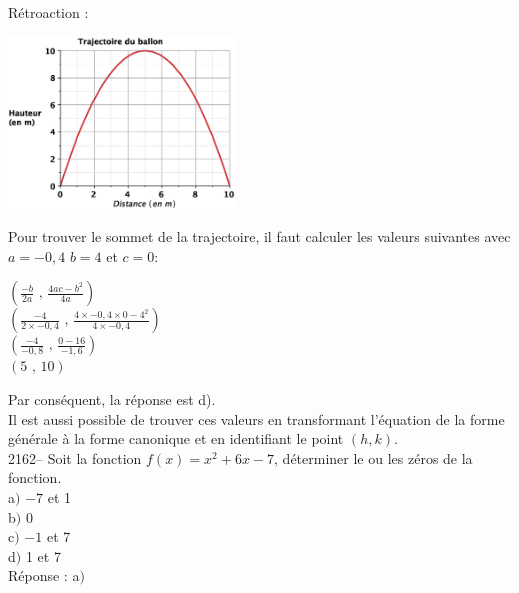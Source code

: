\documentclass[letterpaper, 12pt]{article}
\begin{document}
R\'etroaction :\\
\begin{center}
 \includegraphics[width=6cm,bb=20 186 575 605]{Q2144.eps}
\end{center}
Pour trouver le sommet de la trajectoire, il faut calculer les valeurs suivantes avec $a=-0,4$ $b=4$ et $c=0$:
\begin{center}
 $\left( \frac{-b}{2a} \textrm{ , } \frac{4ac - b^{2}}{4a} \right)$\\[2mm]
 $\left( \frac{-4}{2\times-0,4} \textrm{ , } \frac{4\times -0,4\times 0 - 4^{2}}{4\times -0,4} \right)$\\[2mm]
 $\left( \frac{-4}{-0,8} \textrm{ , } \frac{0 - 16}{-1,6} \right)$\\[2mm]
 $\left( 5 \textrm{ , } 10 \right)$\\
\end{center}
Par cons\'equent, la r\'eponse est d).\\
Il est aussi possible de trouver ces valeurs en transformant l'\'equation de la forme g\'en\'erale \`a la forme canonique et en identifiant le point $(h, k)$.\\

2162-- Soit la fonction $f(x)=x^{2}+6x-7$, d\'eterminer le ou les z\'eros de la fonction.\\

a$)$ $-7$ et 1\\
b$)$ 0\\
c$)$ $-1$ et 7\\
d$)$ 1 et 7\\

R\'eponse : a$)$\\
\end{document}
